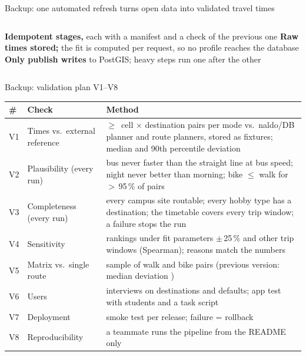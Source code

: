 \documentclass[aspectratio=169,10pt]{beamer}
\begin{document}
\begin{frame}{Backup: one automated refresh turns open data into validated travel times}
  \vspace{2mm}
  \centering\pipelinefigure\par
  \vspace{5mm}
  \begin{columns}[T,onlytextwidth]
    \footnotesize\textbf{Idempotent stages,} each with a manifest and
      a check of the previous one
    \footnotesize\textbf{Raw times stored;} the fit is computed per
      request, so no profile reaches the database
    \footnotesize\textbf{Only publish writes} to PostGIS; heavy steps
      run one after the other
  \end{columns}
\end{frame}

\begin{frame}{Backup: validation plan V1--V8}
  \scriptsize
  \begin{tabular}{@{}l>{\raggedright\arraybackslash}p{40mm}>{\raggedright\arraybackslash}p{90mm}@{}}
    \toprule
    \# & Check & Method \\
    \midrule
    V1 & Times vs.\ external reference & $\geq$\,\factRefPairsMin{} cell $\times$ destination pairs
      per mode vs.\ naldo/DB planner and route planners, stored as fixtures; median and 90th
      percentile deviation \\
    V2 & Plausibility (every run) & bus never faster than the straight line at bus speed; night
      never better than morning; bike $\leq$ walk for $>$\,95\,\% of pairs \\
    V3 & Completeness (every run) & every campus site routable; every hobby type has a
      destination; the timetable covers every trip window; a failure stops the run \\
    V4 & Sensitivity & rankings under fit parameters $\pm$\,25\,\% and other trip windows
      (Spearman); reasons match the numbers \\
    V5 & Matrix vs.\ single route & sample of walk and bike pairs (previous version: median
      deviation \factVTenMedian{}) \\
    V6 & Users & interviews on destinations and defaults; app test with \factUserTests{} students
      and a task script \\
    V7 & Deployment & smoke test per release; failure = rollback \\
    V8 & Reproducibility & a teammate runs the pipeline from the README only \\
    \bottomrule
  \end{tabular}
\end{frame}
\end{document}

